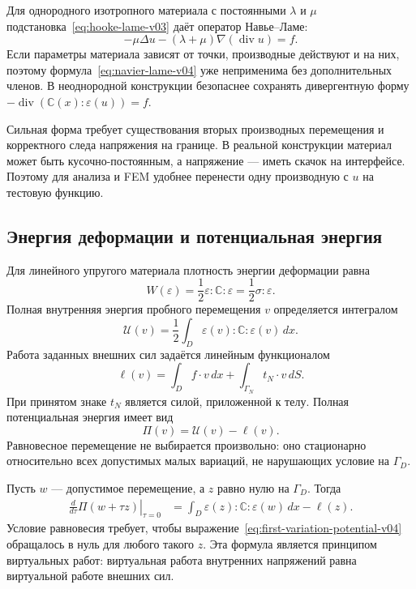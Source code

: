 Для однородного изотропного материала с постоянными $\lambda$ и $\mu$ подстановка~\eqref{eq:hooke-lame-v03} даёт оператор Навье--Ламе:
\begin{equation}
\label{eq:navier-lame-v04}
 -\mu\Delta u-(\lambda+\mu)\nabla(\operatorname{div}u)=f.
\end{equation}
Если параметры материала зависят от точки, производные действуют и на них, поэтому формула~\eqref{eq:navier-lame-v04} уже неприменима без дополнительных членов. В неоднородной конструкции безопаснее сохранять дивергентную форму $-\operatorname{div}(\mathbb C(x):\varepsilon(u))=f$.

Сильная форма требует существования вторых производных перемещения и корректного следа напряжения на границе. В реальной конструкции материал может быть кусочно-постоянным, а напряжение --- иметь скачок на интерфейсе. Поэтому для анализа и FEM удобнее перенести одну производную с $u$ на тестовую функцию.

\subsection{Энергия деформации и потенциальная энергия}

Для линейного упругого материала плотность энергии деформации равна
\begin{equation}
\label{eq:strain-energy-density-v04}
 W(\varepsilon)
 =\frac12\varepsilon:\mathbb C:\varepsilon
 =\frac12\sigma:\varepsilon.
\end{equation}
Полная внутренняя энергия пробного перемещения $v$ определяется интегралом
\begin{equation}
\label{eq:internal-energy-v04}
 \mathcal U(v)
 =\frac12\int_D
 \varepsilon(v):\mathbb C:\varepsilon(v)\,dx.
\end{equation}
Работа заданных внешних сил задаётся линейным функционалом
\begin{equation}
\label{eq:load-functional-v04}
 \ell(v)
 =\int_D f\cdot v\,dx
 +\int_{\Gamma_N}t_N\cdot v\,dS.
\end{equation}
При принятом знаке $t_N$ является силой, приложенной к телу. Полная потенциальная энергия имеет вид
\begin{equation}
\label{eq:total-potential-energy-v04}
 \Pi(v)=\mathcal U(v)-\ell(v).
\end{equation}
Равновесное перемещение не выбирается произвольно: оно стационарно относительно всех допустимых малых вариаций, не нарушающих условие на $\Gamma_D$.

Пусть $w$ --- допустимое перемещение, а $z$ равно нулю на $\Gamma_D$. Тогда
\begin{align}
 \left.\frac{d}{d\tau}\Pi(w+\tau z)\right|_{\tau=0}
 &=\int_D
 \varepsilon(z):\mathbb C:\varepsilon(w)\,dx
 -\ell(z).
 \label{eq:first-variation-potential-v04}
\end{align}
Условие равновесия требует, чтобы выражение~\eqref{eq:first-variation-potential-v04} обращалось в нуль для любого такого $z$. Эта формула является принципом виртуальных работ: виртуальная работа внутренних напряжений равна виртуальной работе внешних сил.


